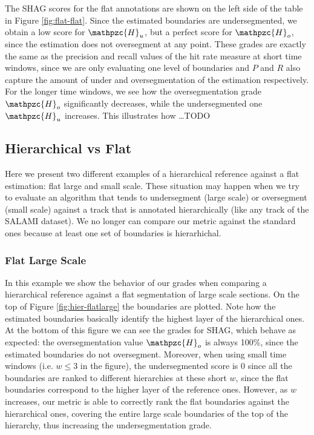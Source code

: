 \documentclass{article}
\begin{document}
The SHAG scores for the flat annotations are shown on the left side of the table in Figure \ref{fig:flat-flat}.
Since the estimated boundaries are undersegmented, we obtain a low score for $\mathpzc{H}_u$, but a perfect score for $\mathpzc{H}_o$, since the estimation does not oversegment at any point.
These grades are exactly the same as the precision and recall values of the hit rate measure at short time windows, since we are only evaluating one level of boundaries and $P$ and $R$ also capture the amount of under and oversegmentation of the estimation respectively.
For the longer time windows, we see how the oversegmentation grade $\mathpzc{H}_o$ significantly decreases, while the undersegmented one $\mathpzc{H}_u$ increases.
This illustrates how \dots TODO

\subsection{Hierarchical vs Flat}

Here we present two different examples of a hierarchical reference against a flat estimation: flat large and small scale.
These situation may happen when we try to evaluate an algorithm that tends to undersegment (large scale) or oversegment  (small scale) against a track that is annotated hierarchically (like any track of the SALAMI dataset).
We no longer can compare our metric against the standard ones because at least one set of boundaries is hierarhichal.

\subsubsection{Flat Large Scale}

In this example we show the behavior of our grades when comparing a hierarchical reference against a flat segmentation of large scale sections.
On the top of Figure \ref{fig:hier-flatlarge} the boundaries are plotted.
Note how the estimated boundaries basically identify the highest layer of the hierarchical ones.
At the bottom of this figure we can see the grades for SHAG, which behave as expected: the oversegmentation value $\mathpzc{H}_o$ is always 100\%, since the estimated boundaries do not oversegment.
Moreover, when using small time windows (i.e. $w \leq 3$ in the figure), the undersegmented score is 0 since all the boundaries are ranked to different hierarchies at these short $w$, since the flat boundaries correspond to the higher layer of the reference ones.
However, as $w$ increases, our metric is able to correctly rank the flat boundaries against the hierarchical ones, covering the entire large scale boundaries of the top of the hierarchy, thus increasing the undersegmentation grade.
\end{document}
